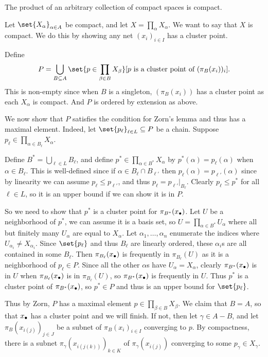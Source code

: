 \bthrm[title=Tychonoff]

    The product of an arbitrary collection of compact spaces is compact.

\ethrm

\bproof

    Let $\set{X_\alpha}_{\alpha\in A}$ be compact, and let $X=\prod_\alpha X_\alpha$.
    We want to say that $X$ is compact.
    We do this by showing any net $(x_i)_{i\in I}$ has a cluster point.

    Define
    $$ P = \bigcup_{B\subseteq A}\set{p\in\prod_{\beta\in B}X_\beta}[\hbox{$p$ is a cluster point of $(\pi_B(x_i))_i$}] . $$
    This is non-empty since when $B$ is a singleton, $(\pi_B(x_i))$ has a cluster point as each $X_\alpha$ is compact.
    And $P$ is ordered by extension as above.

    We now show that $P$ satisfies the condition for Zorn's lemma and thus has a maximal element.
    Indeed, let $\set{p_\ell}_{\ell\in L}\subseteq P$ be a chain.
    Suppose $p_\ell\in\prod_{\alpha\in B_\ell}X_\alpha$.

    Define $B^*=\bigcup_{\ell\in L}B_\ell$, and define $p^*\in\prod_{\alpha\in B^*}X_\alpha$ by $p^*(\alpha)=p_\ell(\alpha)$ when $\alpha\in B_\ell$.
    This is well-defined since if $\alpha\in B_\ell\cap B_{\ell'}$ then $p_\ell(\alpha)=p_{\ell'}(\alpha)$ since by linearity we can assume $p_\ell\leq p_{\ell'}$,
    and thus $p_\ell=p_{\ell'}|_{B_\ell}$.
    Clearly $p_\ell\leq p^*$ for all $\ell\in L$, so it is an upper bound if we can show it is in $P$.

    So we need to show that $p^*$ is a cluster point for $\pi_{B^*}(x_\bullet)$.
    Let $U$ be a neighborhood of $p^*$, we can assume it is a basis set, so $U=\prod_{\alpha\in B^*}U_\alpha$ where all but finitely many $U_\alpha$ are equal to $X_\alpha$.
    Let $\alpha_1,\dots,\alpha_n$ enumerate the indices where $U_{\alpha_i}\neq X_{\alpha_i}$.
    Since $\set{p_\ell}$ and thus $B_\ell$ are linearly ordered, these $\alpha_i$s are all contained in some $B_\ell$.
    Then $\pi_{B_\ell}(x_\bullet)$ is frequently in $\pi_{B_\ell}(U)$ as it is a neighborhood of $p_\ell\in P$.
    Since all the other $\alpha$s have $U_\alpha=X_\alpha$, clearly $\pi_{B^*}(x_\bullet)$ is in $U$ when $\pi_{B_\ell}(x_\bullet)$ is in $\pi_{B_\ell}(U)$,
    so $\pi_{B^*}(x_\bullet)$ is frequently in $U$.
    Thus $p^*$ is a cluster point of $\pi_{B^*}(x_\bullet)$, so $p^*\in P$ and thus is an upper bound for $\set{p_\ell}$.

    Thus by Zorn, $P$ has a maximal element $p\in\prod_{\beta\in B}X_\beta$.
    We claim that $B=A$, so that $x_\bullet$ has a cluster point and we will finish.
    If not, then let $\gamma\in A-B$, and let $\pi_B(x_{i(j)})_{j\in J}$ be a subnet of $\pi_B(x_i)_{i\in I}$ converging to $p$.
    By compactness, there is a subnet $\pi_\gamma(x_{i(j(k))})_{k\in K}$ of $\pi_\gamma(x_{i(j)})$ converging to some $p_\gamma\in X_\gamma$.

